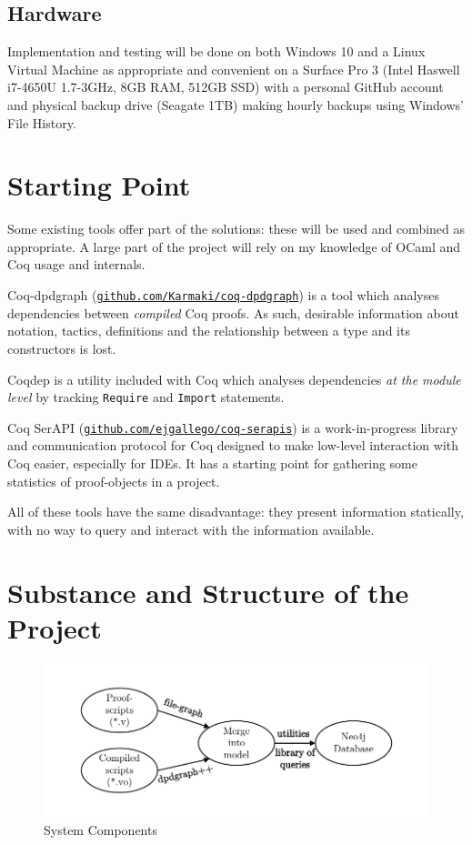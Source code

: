 \documentclass[12pt,a4paper]{article}
\begin{document}
\subsection*{Hardware}
Implementation and testing will be done on both Windows 10 and a Linux Virtual
Machine as appropriate and convenient on a Surface Pro 3 (Intel Haswell i7-4650U
1.7-3GHz, 8GB RAM, 512GB SSD) with a personal GitHub account and physical backup
drive (Seagate 1TB) making hourly backups using Windows' File History.

\section*{Starting Point}
Some existing tools offer part of the solutions: these will be used and
combined as appropriate. A large part of the project will rely on my knowledge of
OCaml and Coq usage and internals.

Coq-dpdgraph
(\href{http://github.com/Karmaki/coq-dpdgraph}{\texttt{github.com/Karmaki/coq-dpdgraph}})
is a tool which analyses dependencies between \emph{compiled} Coq proofs. As
such, desirable information about notation, tactics, definitions and the
relationship between a type and its constructors is lost.

Coqdep is a utility included with Coq which analyses dependencies \emph{at the
module level} by tracking {\tt Require} and {\tt Import} statements.

Coq SerAPI
(\href{http://github.com/ejgallego/coq-serapis}{\texttt{github.com/ejgallego/coq-serapis}})
is a work-in-progress library and communication protocol for Coq designed to
make low-level interaction with Coq easier, especially for IDEs. It has a
starting point for gathering some statistics of proof-objects in a project.

All of these tools have the same disadvantage: they present information statically,
with no way to query and interact with the information available.

\section*{Substance and Structure of the Project}
\begin{figure}[tb]
	\centering
	\includegraphics[width=\textwidth, page=1]{proposal/proposal-project-structure-diagram.pdf} 
  \caption{System Components}\label{fig:propstructure}
\end{figure}
\end{document}
